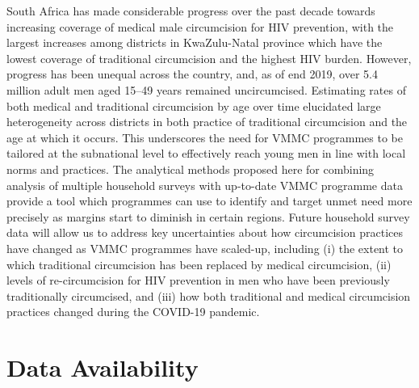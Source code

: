 \documentclass{article}
\begin{document}
South Africa has made considerable progress over the past decade towards increasing coverage of medical male circumcision for HIV prevention, with the largest increases among districts in KwaZulu-Natal province which have the lowest coverage of traditional circumcision and the highest HIV burden. However, progress has been unequal across the country, and, as of end 2019, over 5.4 million adult men aged 15--49 years remained uncircumcised. Estimating rates of both medical and traditional circumcision by age over time elucidated large heterogeneity across districts in both practice of traditional circumcision and the age at which it occurs. This underscores the need for VMMC programmes to be tailored at the subnational level to effectively reach young men in line with local norms and practices. The analytical methods proposed here for combining analysis of multiple household surveys with up-to-date VMMC programme data provide a tool which programmes can use to identify and target unmet need more precisely as margins start to diminish in certain regions. Future household survey data will allow us to address key uncertainties about how circumcision practices have changed as VMMC programmes have scaled-up, including (i) the extent to which traditional circumcision has been replaced by medical circumcision, (ii) levels of re-circumcision for HIV prevention in men who have been previously traditionally circumcised, and (iii) how both traditional and medical circumcision practices changed during the COVID-19 pandemic.


\section*{Data Availability}

\end{document}
